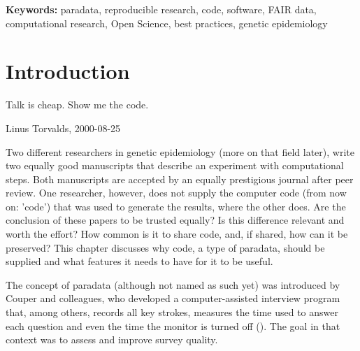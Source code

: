 
{\bf Keywords:} paradata, reproducible research, code, software,
FAIR data, computational research, Open Science, best practices,
genetic epidemiology

\section{Introduction}

\epigraph{
  Talk is cheap. Show me the code.
}{
  Linus Torvalds, 2000-08-25
}


Two different researchers in genetic epidemiology (more on that field later), 
write two equally good manuscripts
that describe an experiment with computational steps.
Both manuscripts are accepted by an equally prestigious journal after peer review. 
One researcher, however, does not supply the
computer code (from now on: 'code') that was used to generate the results,
where the other does.
Are the conclusion of these papers to be trusted equally?
Is this difference relevant and worth the effort?
How common is it to share code, and, if shared, how can it be preserved?
This chapter discusses why code, a type of paradata, 
should be supplied and what features it needs to have
for it to be useful.


The concept of paradata (although not named as such yet) 
was introduced by Couper and colleagues,
who developed a computer-assisted interview program
that, among others, records all key strokes,
measures the time used to answer each question 
and even the time the monitor is turned off (\cite{couper1998measuring}).
The goal in that context was to assess and improve survey quality.

